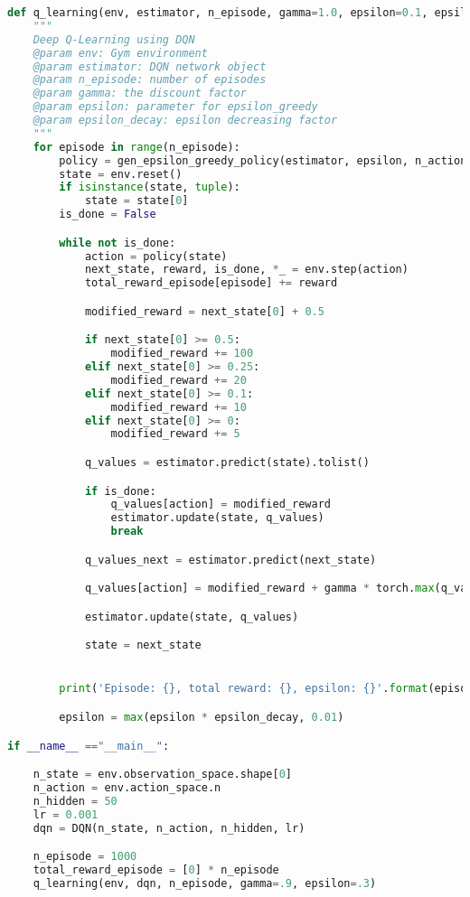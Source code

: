 \begin{lstlisting}[language=Python]
def q_learning(env, estimator, n_episode, gamma=1.0, epsilon=0.1, epsilon_decay=.99):
    """
    Deep Q-Learning using DQN
    @param env: Gym environment
    @param estimator: DQN network object
    @param n_episode: number of episodes
    @param gamma: the discount factor
    @param epsilon: parameter for epsilon_greedy
    @param epsilon_decay: epsilon decreasing factor
    """
    for episode in range(n_episode):
        policy = gen_epsilon_greedy_policy(estimator, epsilon, n_action)
        state = env.reset()
        if isinstance(state, tuple):
            state = state[0]
        is_done = False

        while not is_done:
            action = policy(state)
            next_state, reward, is_done, *_ = env.step(action)
            total_reward_episode[episode] += reward

            modified_reward = next_state[0] + 0.5

            if next_state[0] >= 0.5:
                modified_reward += 100
            elif next_state[0] >= 0.25:
                modified_reward += 20
            elif next_state[0] >= 0.1:
                modified_reward += 10
            elif next_state[0] >= 0:
                modified_reward += 5

            q_values = estimator.predict(state).tolist()

            if is_done:
                q_values[action] = modified_reward
                estimator.update(state, q_values)
                break

            q_values_next = estimator.predict(next_state)

            q_values[action] = modified_reward + gamma * torch.max(q_values_next).item()

            estimator.update(state, q_values)

            state = next_state


        print('Episode: {}, total reward: {}, epsilon: {}'.format(episode, total_reward_episode[episode], epsilon))

        epsilon = max(epsilon * epsilon_decay, 0.01)

if __name__ =="__main__":

    n_state = env.observation_space.shape[0]
    n_action = env.action_space.n
    n_hidden = 50
    lr = 0.001
    dqn = DQN(n_state, n_action, n_hidden, lr)

    n_episode = 1000
    total_reward_episode = [0] * n_episode
    q_learning(env, dqn, n_episode, gamma=.9, epsilon=.3)
\end{lstlisting}

